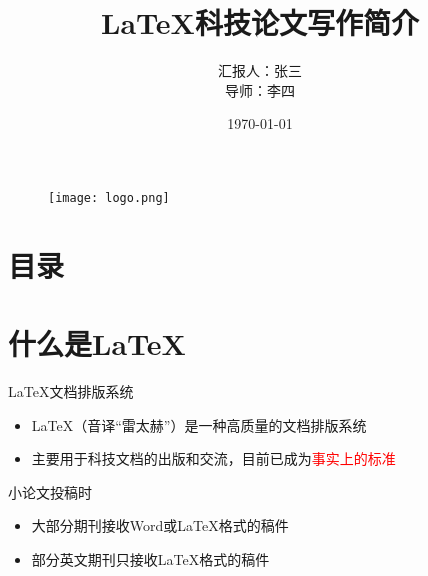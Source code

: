 \documentclass[compress]{beamer}%
\begin{document}
\graphicspath{{figures/}} %
\captionsetup[figure]{font=footnotesize,labelfont=footnotesize}

\title{{\LaTeX}科技论文写作简介}
\author[张三]{汇报人：张三\\ \vskip 5pt 导\quad 师：李四}
\date{\small \vskip -22pt \today}
\begin{frame}
	\vspace{-10mm}
		\maketitle
	\vspace{-44mm}
	\begin{figure}[htbp]
		\begin{center}
			\texttt{[image: logo.png]}
		\end{center}
	\end{figure}
\end{frame}
\section*{目录}
\begin{frame}
	\frametitle{\secname}
    \tableofcontents[]%
\end{frame}
 

\section{什么是\LaTeX}

\begin{frame}{\secname}
    \begin{block}{\LaTeX 文档排版系统}
        \begin{itemize}
            \item LaTeX（音译“雷太赫”）是一种高质量的文档排版系统 \\
            \item 主要用于科技文档的出版和交流，目前已成为\textcolor{red}{事实上的标准}
        \end{itemize}
    \end{block}
    \begin{block}{小论文投稿时}
        \begin{itemize}
            \item 大部分期刊接收Word或LaTeX格式的稿件 \\
            \item 部分英文期刊只接收LaTeX格式的稿件
        \end{itemize}
    \end{block}
\end{frame}
\end{document}
